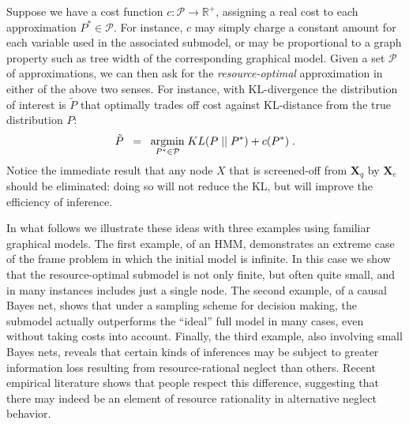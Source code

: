 \documentclass[10pt,letterpaper]{article}
\newcommand{\red}[1]{\textcolor{Red}{#1}}
\begin{document}
Suppose we have a cost function $c: \mathcal{P}\rightarrow\mathbb{R}^+$, assigning a real cost to each approximation $P^* \in \mathcal{P}$. For instance, $c$ may simply charge a constant amount for each variable used in the associated submodel, or may be proportional to a graph property such as tree width of the corresponding graphical model. Given a set $\mathcal{P}$ of approximations, we can then ask for the \emph{resource-optimal} approximation  in either of the above two senses. For instance, with KL-divergence the distribution of interest is $\tilde{P}$ that optimally trades off cost against KL-distance from the true distribution $P$: 
%
\begin{equation} \tilde{P} \;\;= \;\; \underset{P^*\in\mathcal{P}}{\textnormal{argmin}} \; KL(P\;||\;P^*) + c(P^*)\;.\label{optimal}\end{equation}
%
Notice the immediate result that any node $X$ that is screened-off from $\textbf{X}_q$ by $\textbf{X}_e$ should be eliminated: doing so will not reduce the KL, but will improve the efficiency of inference.

In what follows we illustrate these ideas with three examples using familiar graphical models. The first example, of an HMM, demonstrates an extreme case of the frame problem in which the initial model is infinite. In this case we show that the resource-optimal submodel is not only finite, but often quite small, and in many instances includes just a single node. The second example, of a causal Bayes net, shows that under a sampling scheme for decision making, the submodel actually outperforms the ``ideal'' full model in many cases, even without taking costs into account. Finally, the third example, also involving small Bayes nets, reveals that certain kinds of inferences may be subject to greater information loss resulting from resource-rational neglect than others. Recent empirical literature shows that people respect this difference, suggesting that there may indeed be an element of resource rationality in alternative neglect behavior.

\end{document}

